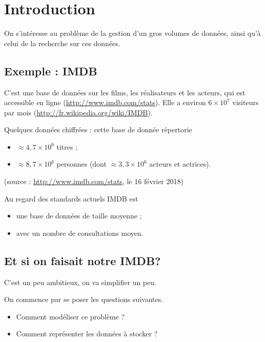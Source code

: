 
\section{Introduction}

On s'intéresse au problème de la gestion d'un gros volumes de données, ainsi qu'à celui de la recherche sur ces données.
\subsection{Exemple : IMDB}

C'est une base de données sur les films, les réalisateurs et les acteurs, qui est accessible en ligne (\url{http://www.imdb.com/stats}).
Elle a environ $6\times 10^{7}$ visiteurs par mois (\url{http://fr.wikipedia.org/wiki/IMDB}).

Quelques données chiffrées : cette base de donnée répertorie
\begin{itemize}
\item $\approx 4,7\times 10^{6}$ titres ;
\item $\approx 8,7\times 10^{6}$ personnes (dont $\approx 3,3\times 10^{6}$ acteurs et actrices).
\end{itemize}
(source : \url{http://www.imdb.com/stats}, le 16 février 2018)

Au regard des standards actuels IMDB est
\begin{itemize}
\item une base de données de taille moyenne ;
\item avec un nombre de consultations moyen.
\end{itemize}


\subsection{Et si on faisait notre IMDB?}

C'est un peu ambitieux, on va simplifier un peu.

On commence par se poser les questions suivantes. 
\begin{itemize}
\item Comment modéliser ce problème ?
\item Comment représenter les données à stocker ?
\end{itemize}

